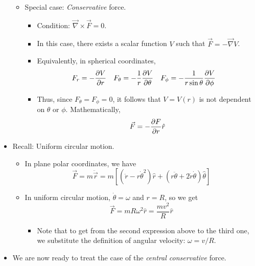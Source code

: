 \documentclass[../notes.tex]{subfiles}
\begin{document}
\begin{itemize}
\begin{itemize}
\begin{itemize}
        \end{itemize}
        \item Special case: \emph{Conservative} force.
        \begin{itemize}
            \item Condition: $\vec{\nabla}\times\vec{F}=0$.
            \item In this case, there exists a scalar function $V$ such that $\vec{F}=-\vec{\nabla}V$.
            \item Equivalently, in spherical coordinates,
            \begin{align*}
                F_r &= -\pdv{V}{r}&
                F_\theta &= -\frac{1}{r}\pdv{V}{\theta}&
                F_\phi &= -\frac{1}{r\sin\theta}\pdv{V}{\phi}
            \end{align*}
            \item Thus, since $F_\theta=F_\phi=0$, it follows that $V=V(r)$ is not dependent on $\theta$ or $\phi$. Mathematically,
            \begin{equation*}
                \vec{F} = -\pdv{F}{r}\hat{r}
            \end{equation*}
        \end{itemize}
    \end{itemize}
    \item Recall: Uniform circular motion.
    \begin{itemize}
        \item In plane polar coordinates, we have
        \begin{equation*}
            \vec{F} = m\ddot{\vec{r}} = m[(\ddot{r}-r\dot{\theta}^2)\hat{r}+(r\ddot{\theta}+2\dot{r}\dot{\theta})\hat{\theta}]
        \end{equation*}
        \item In uniform circular motion, $\dot{\theta}=\omega$ and $r=R$, so we get
        \begin{equation*}
            \vec{F} = mR\omega^2\hat{r}
            = \frac{mv^2}{R}\hat{r}
        \end{equation*}
        \begin{itemize}
            \item Note that to get from the second expression above to the third one, we substitute the definition of angular velocity: $\omega=v/R$.
        \end{itemize}
    \end{itemize}
    \item We are now ready to treat the case of the \emph{central conservative} force.

\end{itemize}
\end{document}
